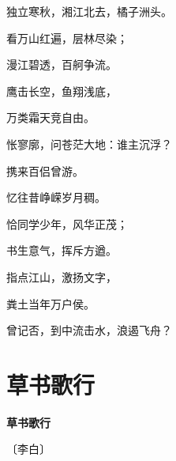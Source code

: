 \documentclass[12pt,UTF-8,openany,fontset=none]{ctexbook}
\begin{document}
    \vspace{18pt}  %

\begin{center}
    \begin{Large}

        独立寒秋，湘江北去，橘子洲头。

        看万山红遍，层林尽染；

        漫江碧透，百舸争流。

        鹰击长空，鱼翔浅底，

        万类霜天竞自由。

        怅寥廓，问苍茫大地：谁主沉浮？

        \vspace{18pt}  %

        携来百侣曾游。

        忆往昔峥嵘岁月稠。

        恰同学少年，风华正茂；

        书生意气，挥斥方遒。

        指点江山，激扬文字，

        粪土当年万户侯。

        曾记否，到中流击水，浪遏飞舟？

    \end{Large}

\end{center}

\vspace{8pt}
\clearpage

\section{草书歌行}


\begin{center}
    {\bfseries 草书歌行}

    \vspace{18pt}

    \begin{large}\xuwen
        〔李白〕
    \end{large}

\end{center}

    \vspace{18pt}  %
\end{document}
